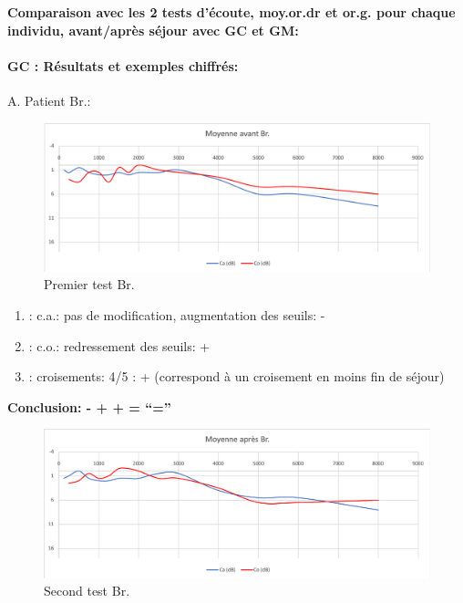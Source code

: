         

       \textbf{ Comparaison avec les 2 tests d'écoute, moy.or.dr et or.g. pour chaque individu,
       avant/après séjour avec GC et GM:} 
       
       \paragraph{ GC : Résultats et exemples chiffrés:}


       
       A. Patient Br.:


       \begin{figure}
\centering
\includegraphics[width=0.7\linewidth]{images/graphiques/bru_pre.png}
\caption[Moyenne OG+OD]{Premier test Br.}
       
\label{groupecontroleimage1}
\end{figure}

	\begin{enumerate}
 		
 		\item : c.a.: pas de modification, augmentation des
                  seuils: -
 		\item : c.o.: redressement des seuils: +
 		\item : croisements: 4/5 : + (correspond à un croisement en moins fin
                  de séjour)
                \end{enumerate}

             \textbf{   Conclusion: - + +          = ``=''}

\begin{figure}
\centering
\includegraphics[width=0.7\linewidth]{images/graphiques/bru_post.png}
\caption[Moyenne OG+OD]{Second test Br.}
       
\label{groupecontroleimage1}
\end{figure}

